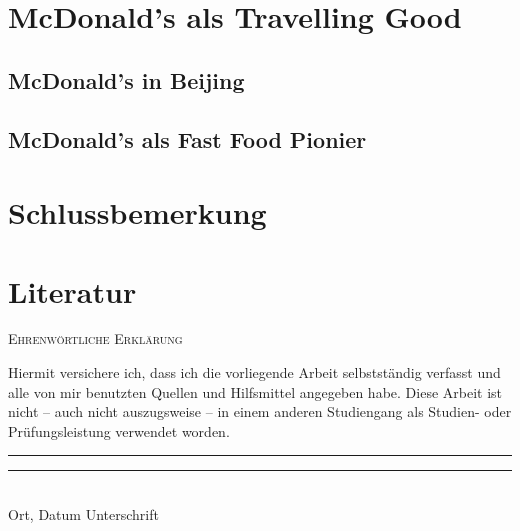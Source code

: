 \documentclass[12pt,titlepage]{scrartcl}
\begin{document}
\lipsum

\lipsum[1-3]


\section{McDonald's als Travelling Good} %
\label{sec:mcdonald_s_als_travelling_good}

\lipsum[1-9]

\subsection{McDonald's in Beijing} %
\label{sub:mcdonald_s_in_beijing}

\lipsum


\subsection{McDonald's als Fast Food Pionier} %
\label{sub:mcdonald_s_als_fast_food_pionier}

\lipsum

\lipsum



\section{Schlussbemerkung} %
\label{sub:schlussbemerkung}

\lipsum


\newpage
\section{Literatur} %
\label{sub:literatur}


\newpage
\appendix

\pagestyle{empty}
\vspace*{\fill}
\noindent
\Huge\textsc{Ehrenwörtliche Erklärung}

\vspace{3em}

\noindent
\normalsize
Hiermit versichere ich, dass ich die vorliegende Arbeit selbstständig verfasst und alle von mir benutzten Quellen und Hilfsmittel angegeben habe. Diese Arbeit ist nicht -- auch nicht auszugsweise -- in einem anderen Studiengang als Studien- oder Prüfungsleistung verwendet worden.

\vspace{7em}

\noindent
\rule{0.4\textwidth}{0.5pt} \hfill \rule{0.4\textwidth}{0.5pt}\\
Ort, Datum \hfill Unterschrift
\vspace*{\fill}
\end{document}
